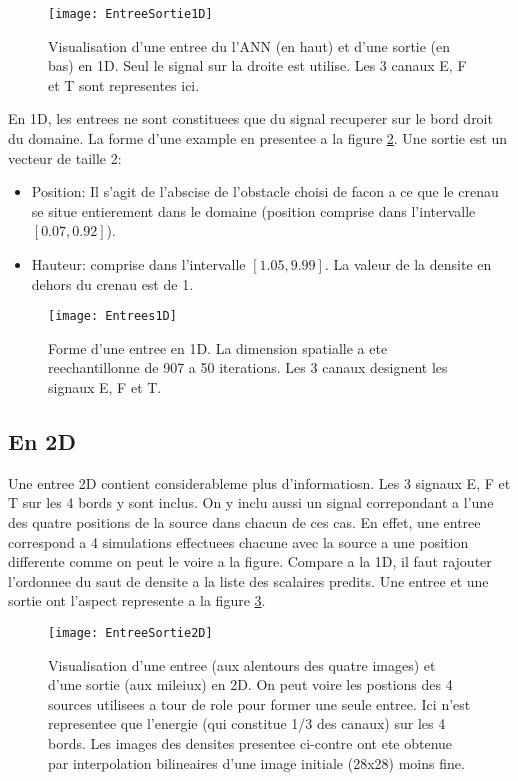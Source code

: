 \begin{figure}[!h]
\centering
\texttt{[image: EntreeSortie1D]} 
\decoRule
\caption[EntreeSortie1D]{Visualisation d'une entree du l'ANN (en haut) et d'une sortie (en bas) en 1D. Seul le signal sur la droite est utilise. Les 3 canaux E, F et T sont representes ici.}
\label{fig:EntreeSortie1D}
\end{figure}

En 1D, les entrees ne sont constituees que du signal recuperer sur le bord droit du domaine. La forme d'une example en presentee a la figure \ref{fig:Entrees1D}. Une sortie est un vecteur de taille 2:
\begin{itemize}
 \item Position: Il s'agit de l'abscise de l'obstacle choisi de facon a ce que le crenau se situe entierement dans le domaine (position comprise dans l'intervalle $[0.07,0.92]$).
 \item Hauteur: comprise dans l'intervalle $[1.05, 9.99]$. La valeur de la densite en dehors du crenau est de 1.
\end{itemize}

\begin{figure}[!h]
\centering
\texttt{[image: Entrees1D]} 
\decoRule
\caption[Entrees1D]{Forme d'une entree en 1D. La dimension spatialle a ete reechantillonne de 907 a 50 iterations. Les 3 canaux designent les signaux E, F et T.}
\label{fig:Entrees1D}
\end{figure}

\subsection{En 2D}
Une entree 2D contient considerableme plus d'informatiosn. Les 3 signaux E, F et T sur les 4 bords y sont inclus. On y inclu aussi un signal correpondant a l'une des quatre positions de la source dans chacun de ces cas. En effet, une entree correspond a 4 simulations effectuees chacune avec la source a une position differente comme on peut le voire a la figure. Compare a la 1D, il faut rajouter l'ordonnee du saut de densite a la liste des scalaires predits. Une entree et une sortie ont l'aspect represente a la figure \ref{fig:EntreeSortie2D}.

\begin{figure}[!h]
\centering
\texttt{[image: EntreeSortie2D]} 
\decoRule
\caption[EntreeSortie2D]{Visualisation d'une entree (aux alentours des quatre images) et d'une sortie (aux mileiux) en 2D. On peut voire les postions des 4 sources utilisees a tour de role pour former une seule entree. Ici n'est representee que l'energie (qui constitue 1/3 des canaux) sur les 4 bords. Les images des densites presentee ci-contre ont ete obtenue par interpolation bilineaires d'une image initiale (28x28) moins fine.}
\label{fig:EntreeSortie2D}
\end{figure}

